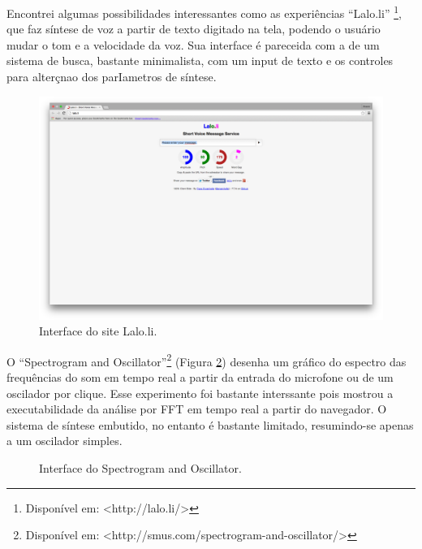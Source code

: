 {Encontrei algumas possibilidades interessantes como as experiências ``Lalo.li'' \footnote{Disponível em: <http://lalo.li/> }, que faz síntese de voz a partir de texto digitado na tela, podendo o usuário mudar o tom e a velocidade da voz. Sua interface é pareceida com a de um sistema de busca, bastante minimalista, com um input de texto e os controles para alterçnao dos parIametros de síntese.

\begin{figure}
    \caption{\label{laloli}Interface do site Lalo.li.}
    
        \includegraphics[width=1\linewidth]{pictures/cap2/laloli}
    
\end{figure}

O ``Spectrogram and Oscillator''\footnote{Disponível em: <http://smus.com/spectrogram-and-oscillator/>} (Figura \ref{spectrogramosc}) desenha um gráfico do espectro das frequências do som em tempo real a partir da entrada do microfone ou de um oscilador por clique. Esse experimento foi bastante interssante pois mostrou a executabilidade da análise por FFT em tempo real a partir do navegador. O sistema de síntese embutido, no entanto é bastante limitado, resumindo-se apenas a um oscilador simples.   



\begin{figure}
    \caption{\label{spectrogramosc}Interface do Spectrogram and Oscillator.}
    

\end{figure}}
